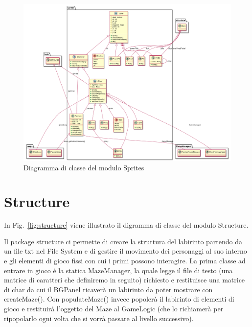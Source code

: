 \documentclass[12pt,a4paper]{report}
\begin{document}
\begin{figure}[p]
\begin{center}
 \centerline{ \includegraphics[width=20cm]{sprites}}
\end{center}
  \caption{Diagramma di classe del modulo Sprites}
  \label{fig:sprites}
\end{figure}

\newpage


\section{Structure}\label{se:arch.structure}
In Fig.~\ref{fig:structure} viene illustrato il digramma di classe del modulo Structure.\newline

Il package structure ci permette di creare la struttura del labirinto partendo da un file txt nel File System e di gestire il movimento dei personaggi al suo interno e gli elementi di gioco fissi con cui i primi possono interagire.
La prima classe ad entrare in gioco è la statica MazeManager, la quale legge il file di testo (una matrice di caratteri che definiremo in seguito) richiesto e restituisce una matrice di char da cui il BGPanel ricaverà un labirinto da poter mostrare con createMaze(). Con populateMaze() invece popolerà il labirinto di elementi di gioco e restituirà l’oggetto del Maze al GameLogic (che lo richiamerà per ripopolarlo ogni volta che si vorrà passare al livello successivo).
\end{document}
